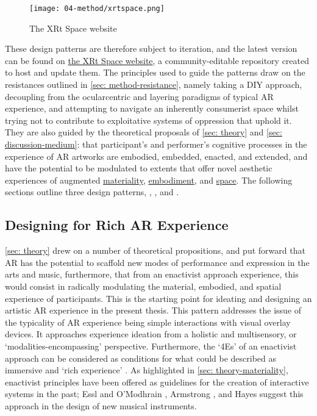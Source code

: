 \begin{figure}
    \centering
    {\texttt{[image: 04-method/xrtspace.png]}}
    \caption[The XRt Space website]{The XRt Space website}
\end{figure}\label{fig: thexrtspace}

These design patterns are therefore subject to iteration, and the latest version can be found on \href{https://www.thexrt.space}{the XRt Space website}, a community-editable repository created to host and update them. The principles used to guide the patterns draw on the resistances outlined in \autoref{sec: method-resistance}, namely taking a DIY approach, decoupling from the ocularcentric and layering paradigms of typical AR experience, and attempting to navigate an inherently consumerist space whilst trying not to contribute to exploitative systems of oppression that uphold it. They are also guided by the theoretical proposals of \autoref{sec: theory} and \autoref{sec: discussion-medium}: that participant's and performer's cognitive processes in the experience of AR artworks are embodied, embedded, enacted, and extended, and have the potential to be modulated to extents that offer novel aesthetic experiences of augmented \hyperref[sec: discussion-medium-material]{materiality}, \hyperref[sec: discussion-medium-embodiment]{embodiment}, and \hyperref[sec: discussion-medium-space]{space}. The following sections outline three design patterns, \textit{}, \textit{}, and \textit{}.

\subsection{Designing for Rich AR Experience} \label{sec: discussion-patterns-experience} 
\autoref{sec: theory} drew on a number of theoretical propositions, and put forward that AR has the potential to scaffold new modes of performance and expression in the arts and music, furthermore, that from an enactivist approach experience, this would consist in radically modulating the material, embodied, and spatial experience of participants. This is the starting point for ideating and designing an artistic AR experience in the present thesis. This pattern addresses the issue of the typicality of AR experience being simple interactions with visual overlay devices. It approaches experience ideation from a holistic and multisensory, or `modalities-encompassing' \citep{schraffenberger2018} perspective. Furthermore, the `4Es' of an enactivist approach can be considered as conditions for what could be described as immersive and `rich experience' \citep{bilbow2021}. As highlighted in \autoref{sec: theory-materiality}, enactivist principles have been offered as guidelines for the creation of interactive systems in the past; Essl and O'Modhrain \citeyearpar{essl2006}, Armstrong \citeyearpar{armstrong2006}, and Hayes \citeyearpar{hayes2019} suggest this approach in the design of new musical instruments. 

